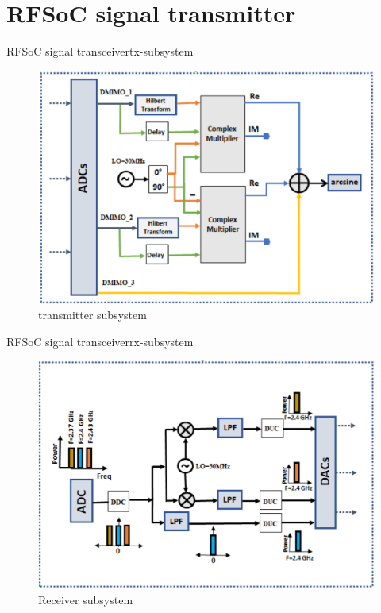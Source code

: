 \section{RFSoC signal transmitter}
\begin{frame}{RFSoC signal transceiver}{tx-subsystem}
	\begin{figure}
		\centering
		\includegraphics[scale=1]{graphics/tx_ss.png}
		\caption{transmitter subsystem}
	\end{figure}
\end{frame}
\begin{frame}{RFSoC signal transceiver}{rx-subsystem}
	\begin{figure}
		\centering
		\includegraphics[scale=1]{graphics/rx_ss.png}
		\caption{Receiver subsystem}
	\end{figure}
\end{frame}
